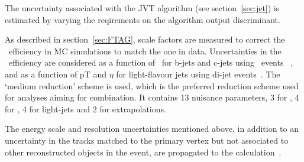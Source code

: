 The uncertainty associated with the JVT algorithm (see section~\ref{sec:jet}) 
is estimated by varying the reqirements on the algorithm output discriminant. 


As described in section~\ref{sec:FTAG}, scale factors are measured 
to correct the \btagging\ efficiency in MC simulations to match the one in data. 
Uncertainties in the \btagging\ efficiency are considered
as a function of \pt\ for b-jets and c-jets using \ttbar\ events~
\cite{FTAG-2018-01,FTAG-paper}, 
and as a function of pT and $\eta$ for
light-flavour jets using di-jet events~\cite{ATLAS-CONF-2018-006}.
The `medium reduction' scheme is used, which is
the preferred reduction scheme used for analyses aiming for combination. 
It contains 13 nuisance parameters, 3 for \bjets, 4 for \cjets, 
4 for light-jets and 2 for extrapolations.


The energy scale and resolution uncertainties mentioned above, 
in addition to an uncertainty in the tracks matched to the primary vertex 
but not associated to other reconstructed objects in the event, are
propagated to the \met calculation~\cite{PERF-2016-07}.




